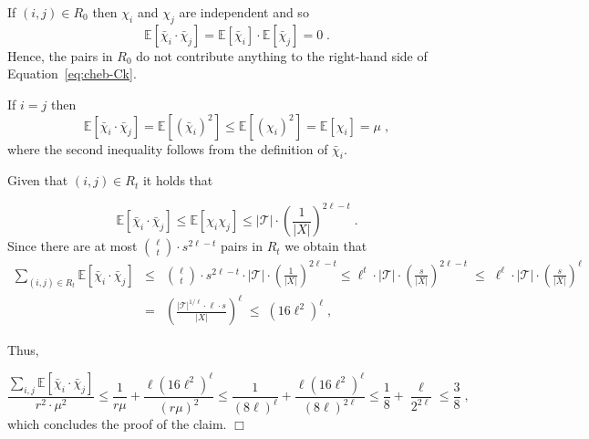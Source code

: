 \documentclass{article}
\newcommand{\Ex}{\mathbb{E}}
\newcommand{\calT}{{\mathcal{T}}}
\newenvironment{proof}{\smallskip\noindent{\bf Proof:}}%
        {\hspace*{\fill}$\Box$\par}
\begin{document}
\begin{proof}
If $(i,j) \in R_0$ then $\chi_{i}$ and $\chi_{j}$ are independent and so
\begin{equation}\label{eq:cheb-Ck-case1}
\Ex[\bar{\chi}_{i}\cdot \bar{\chi}_{j}] =  \Ex[\bar{\chi}_{i}]\cdot \Ex[\bar{\chi}_{j}] = 0\;.
\end{equation}
Hence, the pairs in $R_0$ do not contribute anything to the right-hand side of Equation~\eqref{eq:cheb-Ck}.


If $i = j$ then
\begin{equation}\label{eq:cheb-Ck-case2}
\Ex[\bar{\chi}_{i}\cdot \bar{\chi}_{j}] = \Ex[(\bar{\chi}_{i})^2]
\leq \Ex[(\chi_{i})^2] = \Ex[\chi_{i}] = \mu \;,
\end{equation}
where the second inequality follows from the definition of $\bar{\chi}_{i}$.

Given that $(i,j) \in R_t$ it holds that

\begin{equation}\label{eq:cheb-Ck-case3}
\Ex[\bar{\chi}_{i}\cdot \bar{\chi}_{j}]
\leq \Ex[\chi_{i} \chi_{j}] \leq  |\calT| \cdot \left(\frac{1}{|X|}\right)^{2\ell -t} \;.
\end{equation}
Since there are at most ${\ell \choose t} \cdot s^{2\ell -t}$ pairs in $R_t$ we obtain that
\begin{eqnarray}
\sum_{(i, j)\in R_t}\Ex[\bar{\chi}_{i}\cdot \bar{\chi}_{j}]
&\leq&  {\ell \choose t} \cdot s^{2\ell -t} \cdot |\calT|\cdot   \left(\frac{1}{|X|}\right)^{2\ell -t} \leq \ell^t \cdot |\calT| \cdot \left(\frac{s}{|X|}\right)^{2\ell -t} \;\leq\;  \ell^\ell \cdot |\calT| \cdot   \left(\frac{s}{|X|}\right)^\ell \nonumber\\
&=&  \left( \frac{|\calT|^{1/\ell} \cdot \ell \cdot s}{|X|}\right)^\ell \;\leq\; (16\ell^2)^\ell\;,
\label{eq:cheb-Ck-case4}
\end{eqnarray}

Thus,

\begin{equation}
\frac{\sum_{i,j} \Ex[\bar{\chi}_{i}\cdot \bar{\chi}_{j}]}{r^2\cdot \mu^2}
\leq  \frac{1}{r \mu} + \frac{\ell (16\ell^2)^\ell}{(r \mu)^2} \leq
\frac{1}{(8\ell)^\ell} + \frac{\ell (16\ell^2)^\ell}{(8\ell)^{2\ell}} \leq \frac{1}{8} +  \frac{\ell}{2^{2\ell}} \leq \frac{3}{8}\;,
\end{equation}
which concludes the proof of the claim.  %
\end{proof}

\end{document}
